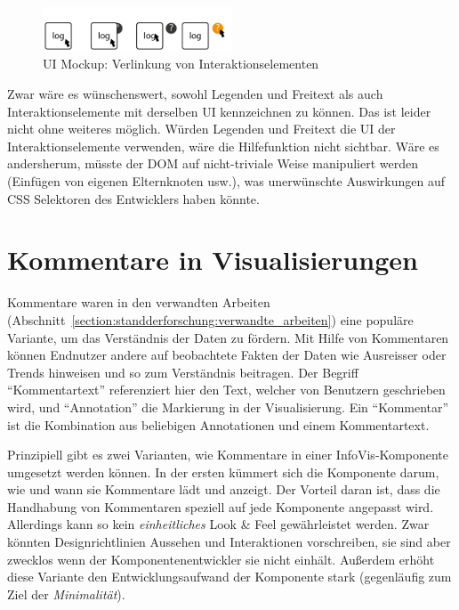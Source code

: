 \documentclass[
	headsepline,
	footsepline,
	fontsize=12pt,
	bibliography=totoc
]{scrbook}
\begin{document}
\begin{figure}[htbp]
   \centering
   \includegraphics[width=0.5\textwidth]{images/konzeption-verlinkung-bedienung.png}
   \caption{UI Mockup: Verlinkung von Interaktionselementen}
   \label{figure:verlinkung-bedienung}
\end{figure}

Zwar wäre es wünschenswert, sowohl Legenden und Freitext als auch Interaktionselemente mit derselben UI kennzeichnen zu können. Das ist leider nicht ohne weiteres möglich. Würden Legenden und Freitext die UI der Interaktionselemente verwenden, wäre die Hilfefunktion nicht sichtbar. Wäre es andersherum, müsste der DOM auf nicht-triviale Weise manipuliert werden (Einfügen von eigenen Elternknoten usw.), was unerwünschte Auswirkungen auf CSS Selektoren des Entwicklers haben könnte.

\section{Kommentare in Visualisierungen}
\label{section:konzeption:kommentare}


Kommentare waren in den verwandten Arbeiten (Abschnitt~\ref{section:standderforschung:verwandte_arbeiten}) eine populäre Variante, um das Verständnis der Daten zu fördern. Mit Hilfe von Kommentaren können Endnutzer andere auf beobachtete Fakten der Daten wie Ausreisser oder Trends hinweisen und so zum Verständnis beitragen. Der Begriff \enquote{Kommentartext} referenziert hier den Text, welcher von Benutzern geschrieben wird, und \enquote{Annotation} die Markierung in der Visualisierung. Ein \enquote{Kommentar} ist die Kombination aus beliebigen Annotationen und einem Kommentartext.


Prinzipiell gibt es zwei Varianten, wie Kommentare in einer InfoVis-Komponente umgesetzt werden können. In der ersten kümmert sich die Komponente darum, wie und wann sie Kommentare lädt und anzeigt. Der Vorteil daran ist, dass die Handhabung von Kommentaren speziell auf jede Komponente angepasst wird. Allerdings kann so kein \emph{einheitliches} Look \& Feel gewährleistet werden. Zwar könnten Designrichtlinien Aussehen und Interaktionen vorschreiben, sie sind aber zwecklos wenn der Komponentenentwickler sie nicht einhält. Außerdem erhöht diese Variante den Entwicklungsaufwand der Komponente stark (gegenläufig zum Ziel der \emph{Minimalität}).
\end{document}
